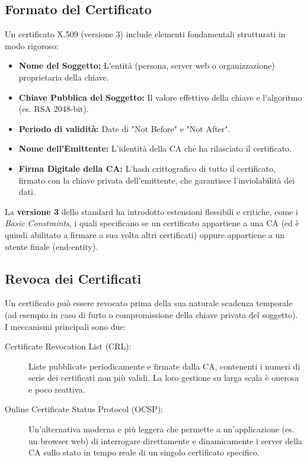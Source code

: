 \subsection{Formato del Certificato}
Un certificato X.509 (versione 3) include elementi fondamentali strutturati in modo rigoroso:
\begin{itemize}
    \item \textbf{Nome del Soggetto:} L'entità (persona, server web o organizzazione) proprietaria della chiave.
    \item \textbf{Chiave Pubblica del Soggetto:} Il valore effettivo della chiave e l'algoritmo (es. RSA 2048-bit).
    \item \textbf{Periodo di validità:} Date di "Not Before" e "Not After".
    \item \textbf{Nome dell'Emittente:} L'identità della CA che ha rilasciato il certificato.
    \item \textbf{Firma Digitale della CA:} L'hash crittografico di tutto il certificato, firmato con la chiave privata dell'emittente, che garantisce l'inviolabilità dei dati.
\end{itemize}

La \textbf{versione 3} dello standard ha introdotto estensioni flessibili e critiche, come i \textit{Basic Constraints}, i quali specificano se un certificato appartiene a una CA (ed è quindi abilitato a firmare a sua volta altri certificati) oppure appartiene a un utente finale (end-entity).

\subsection{Revoca dei Certificati}
Un certificato può essere revocato prima della sua naturale scadenza temporale (ad esempio in caso di furto o compromissione della chiave privata del soggetto). I meccanismi principali sono due:
\begin{description}
    \item[Certificate Revocation List (CRL):] Liste pubblicate periodicamente e firmate dalla CA, contenenti i numeri di serie dei certificati non più validi. La loro gestione su larga scala è onerosa e poco reattiva.
    \item[Online Certificate Status Protocol (OCSP):] Un'alternativa moderna e più leggera che permette a un'applicazione (es. un browser web) di interrogare direttamente e dinamicamente i server della CA sullo stato in tempo reale di un singolo certificato specifico.
\end{description}

